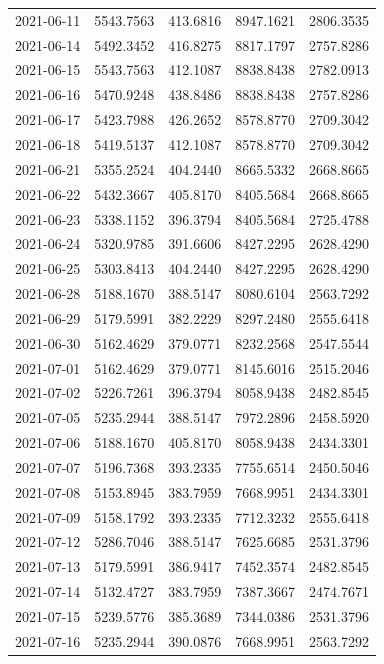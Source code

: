 \begin{footnotesize}
\begin{longtable}{lllll}
2021-06-11 & 5543.7563 & 413.6816 & 8947.1621 & 2806.3535 \\
2021-06-14 & 5492.3452 & 416.8275 & 8817.1797 & 2757.8286 \\
2021-06-15 & 5543.7563 & 412.1087 & 8838.8438 & 2782.0913 \\
2021-06-16 & 5470.9248 & 438.8486 & 8838.8438 & 2757.8286 \\
2021-06-17 & 5423.7988 & 426.2652 & 8578.8770 & 2709.3042 \\
2021-06-18 & 5419.5137 & 412.1087 & 8578.8770 & 2709.3042 \\
2021-06-21 & 5355.2524 & 404.2440 & 8665.5332 & 2668.8665 \\
2021-06-22 & 5432.3667 & 405.8170 & 8405.5684 & 2668.8665 \\
2021-06-23 & 5338.1152 & 396.3794 & 8405.5684 & 2725.4788 \\
2021-06-24 & 5320.9785 & 391.6606 & 8427.2295 & 2628.4290 \\
2021-06-25 & 5303.8413 & 404.2440 & 8427.2295 & 2628.4290 \\
2021-06-28 & 5188.1670 & 388.5147 & 8080.6104 & 2563.7292 \\
2021-06-29 & 5179.5991 & 382.2229 & 8297.2480 & 2555.6418 \\
2021-06-30 & 5162.4629 & 379.0771 & 8232.2568 & 2547.5544 \\
2021-07-01 & 5162.4629 & 379.0771 & 8145.6016 & 2515.2046 \\
2021-07-02 & 5226.7261 & 396.3794 & 8058.9438 & 2482.8545 \\
2021-07-05 & 5235.2944 & 388.5147 & 7972.2896 & 2458.5920 \\
2021-07-06 & 5188.1670 & 405.8170 & 8058.9438 & 2434.3301 \\
2021-07-07 & 5196.7368 & 393.2335 & 7755.6514 & 2450.5046 \\
2021-07-08 & 5153.8945 & 383.7959 & 7668.9951 & 2434.3301 \\
2021-07-09 & 5158.1792 & 393.2335 & 7712.3232 & 2555.6418 \\
2021-07-12 & 5286.7046 & 388.5147 & 7625.6685 & 2531.3796 \\
2021-07-13 & 5179.5991 & 386.9417 & 7452.3574 & 2482.8545 \\
2021-07-14 & 5132.4727 & 383.7959 & 7387.3667 & 2474.7671 \\
2021-07-15 & 5239.5776 & 385.3689 & 7344.0386 & 2531.3796 \\
2021-07-16 & 5235.2944 & 390.0876 & 7668.9951 & 2563.7292 \\

\end{longtable}
\end{footnotesize}
